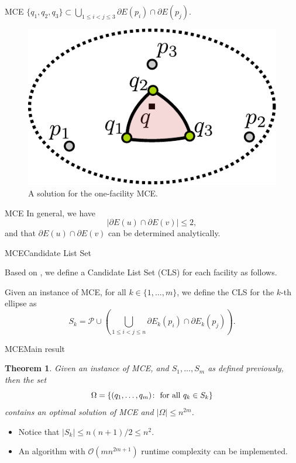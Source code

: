 \documentclass{beamer}
\newcommand{\Pp}{\mathscr{P}}
\newcommand{\bigO}{\mathscr{O}}
\newtheorem{thm}{Theorem}
\theoremstyle{definition}
\begin{document}
\begin{frame}{MCE}
	$\{q_1, q_2, q_3\} \subset \bigcup_{1 \le i < j \le 3} \partial E(p_i) \cap \partial E(p_j)$.
	\begin{figure}
		\centering
		\includegraphics[scale=.55]{figures/mce-mwc1}
		\caption{A solution for the one-facility MCE.}
	\end{figure}
\end{frame}

\begin{frame}{MCE}
	In general, we have
	\begin{equation*}
	|\partial E(u) \cap \partial E(v)| \le 2, 
	\end{equation*}
	and that $\partial E(u) \cap \partial E(v)$ can be determined analytically.
\end{frame}

\begin{frame}{MCE}{Candidate List Set}
	
	Based on \cite{church:1984}, we define a Candidate List Set (CLS) for each facility as follows.
	
	\begin{definition}\label{def:cls_mce}
		Given an instance of MCE, for all $k \in \{1, \dots, m\}$, we define the CLS for the $k$-th ellipse as
		\begin{equation*}
		S_k = \Pp \cup \left(\bigcup_{1 \le i < j \le n} \partial E_k(p_i) \cap \partial E_k(p_j) \right).
		\end{equation*}
	\end{definition}
\end{frame}

\begin{frame}{MCE}{Main result}
	\begin{thm}\label{thm:mce}
		Given an instance of MCE, and $S_1, \dots, S_m$ as defined previously, then the set $$\Omega = \{(q_1, \dots, q_m) \colon \textnormal{ for all }q_k \in S_k \}$$ contains an optimal solution of MCE and $|\Omega| \le n^{2m}$. 
	\end{thm}

\begin{itemize}
	\item Notice that $|S_k| \le n(n+1)/2 \le n^2$.
	\item An algorithm with $\bigO(mn^{2m+1})$ runtime complexity can be implemented.
\end{itemize}

\end{frame}
\end{document}
